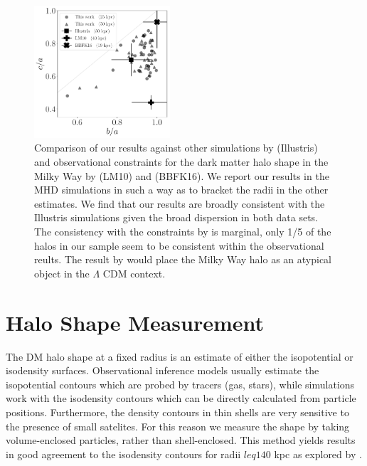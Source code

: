 \documentclass[a4paper,fleqn,usenatbib]{mnras}
\begin{document}
\begin{figure}
\begin{center}
\includegraphics[width=0.45\textwidth]{triaxiality_observations.pdf}
\end{center}
\caption{Comparison of our results against other simulations
  by \citet{Chua19} (Illustris) and observational constraints for the 
dark matter halo shape in the Milky Way by \citet{LM10} (LM10) and
\citet{Bovy16} (BBFK16).   
We report our results in the MHD simulations in such a way as to
bracket the radii in the other estimates.
We find that our results are broadly consistent with the Illustris
simulations given the broad dispersion in both data sets.
The consistency with the constraints by \citet{Bovy16} is marginal,
only 1/5 of the halos in our sample seem to be consistent within the
observational reults.
The result by \citet{LM10} would place the Milky Way halo as an
atypical object in the $\Lambda$ CDM context.} 
\label{fig:observations}
\end{figure}


\section{Halo Shape Measurement}


The DM halo shape at a fixed radius is an estimate of either
the isopotential or isodensity surfaces.  
Observational inference models usually estimate the 
isopotential contours which are probed by tracers (gas, stars), while
simulations work with the isodensity contours which can be directly
calculated from particle positions.  
Furthermore, the density contours in thin shells are very sensitive to
the presence of small satelites.  
For this reason we measure the shape by taking
volume-enclosed particles, rather than shell-enclosed.  
This method yields results in good agreement to the isodensity
contours for radii $leq 140$ kpc as explored by
\citep{VeraCiro11}.  
\end{document}
